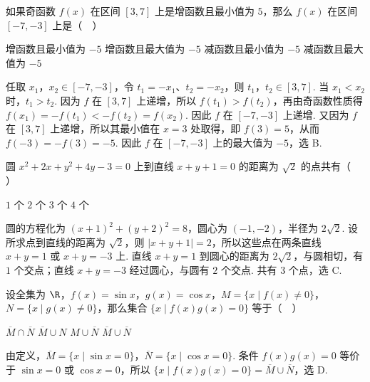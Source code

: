 \documentclass[UTF8,a4paper,oneside,11pt]{ctexbook}
\begin{document}
\begin{problem}
如果奇函数 \(f(x)\) 在区间 \([3,7]\) 上是增函数且最小值为 \(5\)，那么 \(f(x)\) 在区间 \([-7,-3]\) 上是（\(\quad\)）

\choices
    {增函数且最小值为 \(-5\)}
    {增函数且最大值为 \(-5\)}
    {减函数且最小值为 \(-5\)}
    {减函数且最大值为 \(-5\)}


\begin{solution}
任取 \(x_1\)，\(x_2\in[-7,-3]\)，令 \(t_1=-x_1\)、\(t_2=-x_2\)，则 \(t_1\)，\(t_2\in[3,7]\). 当 \(x_1<x_2\) 时，\(t_1>t_2\). 因为 \(f\) 在 \([3,7]\) 上递增，所以 \(f(t_1)>f(t_2)\)，再由奇函数性质得 \(f(x_1)=-f(t_1)<-f(t_2)=f(x_2)\). 因此 \(f\) 在 \([-7,-3]\) 上递增. 又因为 \(f\) 在 \([3,7]\) 上递增，所以其最小值在 \(x=3\) 处取得，即 \(f(3)=5\)，从而 \(f(-3)=-f(3)=-5\). 因此 \(f\) 在 \([-7,-3]\) 上的最大值为 \(-5\)，选 B.
\end{solution}
\end{problem}

\begin{problem}
圆 \(x^{2} + 2x + y^{2} + 4y - 3 = 0\) 上到直线 \(x + y + 1 = 0\) 的距离为 \(\sqrt{2}\) 的点共有（\(\quad\)）

\choices
    {\(1\) 个}
    {\(2\) 个}
    {\(3\) 个}
    {\(4\) 个}


\begin{solution}
圆的方程化为 \(\left(x+1\right)^2+\left(y+2\right)^2=8\)，圆心为 \((-1,-2)\)，半径为 \(2\sqrt2\). 设所求点到直线的距离为 \(\sqrt2\)，则 \(\lvert x+y+1\rvert=2\)，所以这些点在两条直线 \(x+y=1\) 或 \(x+y=-3\) 上. 直线 \(x+y=1\) 到圆心的距离为 \(2\sqrt{2}\)，与圆相切，有 \(1\) 个交点；直线 \(x+y=-3\) 经过圆心，与圆有 \(2\) 个交点. 共有 \(3\) 个点，选 C.
\end{solution}
\end{problem}

\begin{problem}
设全集为 \(\R\)，\(f(x)=\sin x\)，\(g(x)=\cos x\)，\(M=\{x\mid f(x)\neq 0\}\)，\(N=\{x\mid g(x)\neq 0\}\)，那么集合 \(\{x\mid f(x)g(x)=0\}\) 等于（\(\quad\)）

\choices
    {\(\overline{M} \cap \overline{N}\)}
    {\(\overline{M} \cup N\)}
    {\(M \cup \overline{N}\)}
    {\(\overline{M} \cup \overline{N}\)}


\begin{solution}
由定义，\(\overline M=\{x\mid\sin x=0\}\)，\(\overline N=\{x\mid\cos x=0\}\). 条件 \(f(x)g(x)=0\) 等价于 \(\sin x=0\) 或 \(\cos x=0\)，所以 \(\{x\mid f(x)g(x)=0\}=\overline M\cup\overline N\)，选 D.
\end{solution}
\end{problem}
\end{document}
